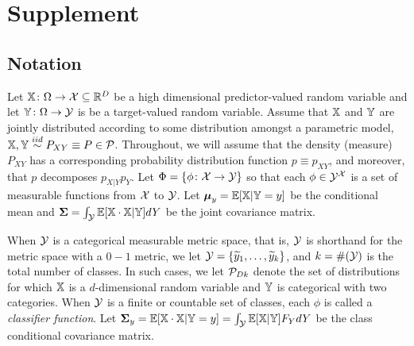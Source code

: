 \documentclass[10pt]{article}
\begin{document}
\begin{comment}
\section{Code}
\subsection{LOL}

\end{comment}




\section{Supplement}
\subsection{Notation}


Let $\mathbb{X} {\colon} \Omega \to \mathcal{X} \subseteq \mathbb{R}^D$ be a high dimensional predictor-valued random variable and let $\mathbb{Y} {\colon} \Omega \to \mathcal{Y}$ is be a target-valued random variable.
Assume that $\mathbb{X}$ and $\mathbb{Y}$ are jointly distributed according to some distribution amongst a parametric model, $\mathbb{X}, \mathbb{Y} \overset{iid}{\sim} P_{XY} \equiv P \in \mathcal{P}$.  Throughout, we will assume that the density (measure) $P_{XY}$ has a corresponding probability distribution function $p \equiv p_{XY}$, and moreover, that $p$ decomposes $p_{X|Y}p_Y$.   
Let $\Phi=\{\phi {\ensuremath{\colon}} \mathcal{X} \to \mathcal{Y}\}$ so that each $\phi \in \mathcal{Y}^{\mathcal{X}}$ is a set of measurable functions from $\mathcal{X}$ to $\mathcal{Y}$.
Let $\boldsymbol{\mu}_y=\mathbb{E}[\mathbb{X} | \mathbb{Y}=y]$ be the conditional mean and $\boldsymbol{\Sigma}=\int_{\mathcal{Y}} \mathbb{E}[\mathbb{X} \cdot \mathbb{X} | \mathbb{Y}]dY$ be the joint covariance matrix.


When $\mathcal{Y}$ is a categorical measurable metric space, that is, $\mathcal{Y}$ is shorthand for the metric space with a $0-1$ metric, we let $\mathcal{Y}=\{\widetilde{y}_1, \ldots, \widetilde{y}_k\}$, and $k = \#(\mathcal{Y})$ is the total number of classes.  In such cases, we let $\mathcal{P}_{Dk}$ denote the set of distributions for which $\mathbb{X}$ is a $d$-dimensional random variable and $\mathbb{Y}$ is categorical with two categories. When $\mathcal{Y}$ is a finite or countable set of classes, each $\phi$ is called a \emph{classifier function}.  Let $\boldsymbol{\Sigma}_y=\mathbb{E}[\mathbb{X} \cdot \mathbb{X} | \mathbb{Y}=y] = \int_{\mathcal{Y}} \mathbb{E}[\mathbb{X} | \mathbb{Y}] F_Y dY$ be the class conditional covariance matrix.
\end{document}
